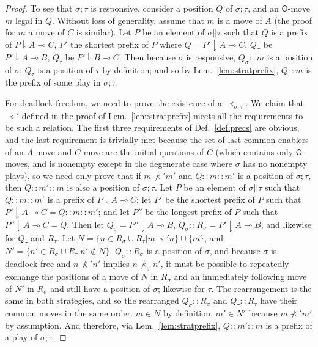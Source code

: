 \documentclass{article}
\newcommand{\keep}{\downharpoonright}
\begin{document}
\begin{proof}
  To see that $\sigma;\tau$ is responsive, consider a position $Q$ of $\sigma;\tau$, and an $\mathsf{O}$-move $m$ legal in $Q$. Without loss of generality, assume that $m$ is a move of $A$ (the proof for $m$ a move of $C$ is similar). Let $P$ be an element of $\sigma||\tau$ such that $Q$ is a prefix of $P\keep A\multimap C$, $P'$ the shortest prefix of $P$ where $Q = P'\keep A\multimap C$, $Q_\sigma$ be $P'\keep A\multimap B$, $Q_\tau$ be $P'\keep B\multimap C$. Then because $\sigma$ is responsive, $Q_\sigma::m$ is a position of $\sigma$; $Q_\tau$ is a position of $\tau$ by definition; and so by Lem.~\ref{lem:stratprefix}, $Q::m$ is the prefix of some play in $\sigma;\tau$.

  For deadlock-freedom, we need to prove the existence of a $\prec_{\sigma;\tau}$. We claim that $\prec'$ defined in the proof of Lem.~\ref{lem:stratprefix} meets all the requirements to be such a relation. The first three requirements of Def.~\ref{def:precs} are obvious, and the last requirement is trivially met because the set of last common enablers of an $A$-move and $C$-move are the initial questions of $C$ (which contains only $\mathsf{O}$-moves, and is nonempty except in the degenerate case where $\sigma$ has no nonempty plays), so we need only prove that if $m\nprec'm'$ and $Q::m::m'$ is a position of $\sigma;\tau$, then $Q::m'::m$ is also a position of $\sigma;\tau$. Let $P$ be an element of $\sigma||\tau$ such that $Q::m::m'$ is a prefix of $P\keep A\multimap C$; let $P'$ be the shortest prefix of $P$ such that $P'\keep A\multimap C = Q::m::m'$; and let $P''$ be the longest prefix of $P$ such that $P''\keep A\multimap C = Q$. Then let $Q_\sigma = P''\keep A\multimap B$, $Q_\sigma::R_\sigma = P'\keep A\multimap B$, and likewise for $Q_\tau$ and $R_\tau$. Let $N = \{n\in R_\sigma\cup R_\tau | m\prec'n\}\cup\{m\}$, and $N' = \{n'\in R_\sigma\cup R_\tau | n'\not\in N\}$. $Q_\sigma::R_\sigma$ is a position of $\sigma$, and because $\sigma$ is deadlock-free and $n\nprec' n'$ implies $n\nprec_\sigma n'$, it must be possible to repeatedly exchange the positions of a move of $N$ in $R_\sigma$ and an immediately following move of $N'$ in $R_\sigma$ and still have a position of $\sigma$; likewise for $\tau$. The rearrangement is the same in both strategies, and so the rearranged $Q_\sigma::R_\sigma$ and $Q_\tau::R_\tau$ have their common moves in the same order. $m\in N$ by definition, $m'\in N'$ because $m\nprec'm'$ by assumption. And therefore, via Lem.~\ref{lem:stratprefix}, $Q::m'::m$ is a prefix of a play of $\sigma;\tau$.


\end{proof}
\end{document}
